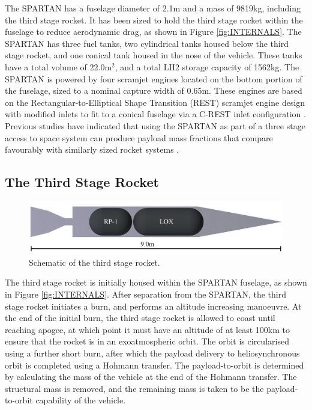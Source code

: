 \documentclass[journal]{new-aiaa}
\begin{document}
The SPARTAN has a fuselage diameter of 2.1m and a mass of 9819kg, including the third stage rocket. It has been sized to hold the third stage rocket within the fuselage to reduce aerodynamic drag, as shown in Figure \ref{fig:INTERNALS}. The SPARTAN has three fuel tanks, two cylindrical tanks housed below the third stage rocket, and one conical tank housed in the nose of the vehicle. These tanks have a total volume of 22.0m$^2$, and a total LH2 storage capacity of 1562kg. 
The SPARTAN is powered by four scramjet engines located on the bottom portion of the fuselage, sized to a nominal capture width of 0.65m. These engines are based on the Rectangular-to-Elliptical Shape Transition (REST) scramjet engine design \cite{Suraweera2009} with modified inlets to fit to a conical fuselage via a C-REST inlet configuration \cite{Gollan2010}. Previous studies have indicated that using the SPARTAN as part of a three stage access to space system can produce payload mass fractions that compare favourably with similarly sized rocket systems \cite{Preller2015a,Preller2017}. 


\subsection{The Third Stage Rocket}\label{section:rocket}
\begin{figure}[ht]
	\centering
	\includegraphics[width=0.6\linewidth]{3rdStage}
	\caption{Schematic of the third stage rocket.}
	\label{fig:ThirdStage}
\end{figure}

The third stage rocket is initially housed within the SPARTAN fuselage, as shown in Figure \ref{fig:INTERNALS}. After separation from the SPARTAN, the third stage rocket initiates a burn, and performs an altitude increasing manoeuvre. 
At the end of the initial burn, the third stage rocket is allowed to coast until reaching apogee, at which point it must have an altitude of at least 100km to ensure that the rocket is in an exoatmospheric orbit. The orbit is circularised using a further short burn, after which the payload delivery to heliosynchronous orbit is completed using a Hohmann transfer. The payload-to-orbit is determined by calculating the mass of the vehicle at the end of the Hohmann transfer. The structural mass is removed, and the remaining mass is taken to be the payload-to-orbit capability of the vehicle. 
\end{document}
